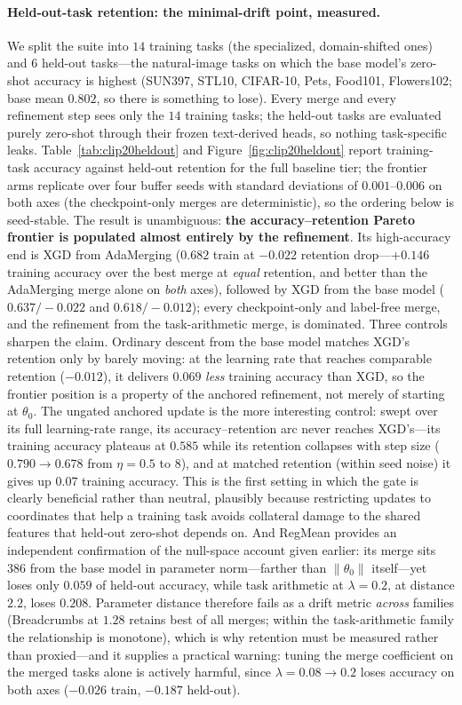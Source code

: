\documentclass{article} %
\begin{document}
\paragraph{Held-out-task retention: the minimal-drift point, measured.}
We split the suite into $14$ training tasks (the specialized, domain-shifted ones) and $6$ held-out tasks---the natural-image tasks on which the base model's zero-shot accuracy is highest (SUN397, STL10, CIFAR-10, Pets, Food101, Flowers102; base mean $0.802$, so there is something to lose). Every merge and every refinement step sees only the $14$ training tasks; the held-out tasks are evaluated purely zero-shot through their frozen text-derived heads, so nothing task-specific leaks. Table~\ref{tab:clip20heldout} and Figure~\ref{fig:clip20heldout} report training-task accuracy against held-out retention for the full baseline tier; the frontier arms replicate over four buffer seeds with standard deviations of $0.001$--$0.006$ on both axes (the checkpoint-only merges are deterministic), so the ordering below is seed-stable. The result is unambiguous: \textbf{the accuracy--retention Pareto frontier is populated almost entirely by the refinement}. Its high-accuracy end is XGD from AdaMerging ($0.682$ train at $-0.022$ retention drop---$+0.146$ training accuracy over the best merge at \emph{equal} retention, and better than the AdaMerging merge alone on \emph{both} axes), followed by XGD from the base model ($0.637/-0.022$ and $0.618/-0.012$); every checkpoint-only and label-free merge, and the refinement from the task-arithmetic merge, is dominated. Three controls sharpen the claim. Ordinary descent from the base model matches XGD's retention only by barely moving: at the learning rate that reaches comparable retention ($-0.012$), it delivers $0.069$ \emph{less} training accuracy than XGD, so the frontier position is a property of the anchored refinement, not merely of starting at $\theta_0$. The ungated anchored update is the more interesting control: swept over its full learning-rate range, its accuracy--retention arc never reaches XGD's---its training accuracy plateaus at $0.585$ while its retention collapses with step size ($0.790\!\to\!0.678$ from $\eta=0.5$ to $8$), and at matched retention (within seed noise) it gives up $0.07$ training accuracy. This is the first setting in which the gate is clearly beneficial rather than neutral, plausibly because restricting updates to coordinates that help a training task avoids collateral damage to the shared features that held-out zero-shot depends on. And RegMean provides an independent confirmation of the null-space account given earlier: its merge sits $386$ from the base model in parameter norm---farther than $\lVert\theta_0\rVert$ itself---yet loses only $0.059$ of held-out accuracy, while task arithmetic at $\lambda=0.2$, at distance $2.2$, loses $0.208$. Parameter distance therefore fails as a drift metric \emph{across} families (Breadcrumbs at $1.28$ retains best of all merges; within the task-arithmetic family the relationship is monotone), which is why retention must be measured rather than proxied---and it supplies a practical warning: tuning the merge coefficient on the merged tasks alone is actively harmful, since $\lambda\!=\!0.08\!\to\!0.2$ loses accuracy on both axes ($-0.026$ train, $-0.187$ held-out).
\end{document}
